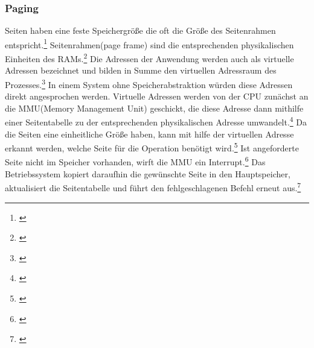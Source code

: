 \subsubsection{Paging}
Seiten haben eine feste Speichergröße die oft die Größe des Seitenrahmen entspricht.\footnote{\cite[S.~253]{Tanenbaum.2016}} Seitenrahmen(page frame) sind die entsprechenden physikalischen Einheiten des RAMs.\footnote{\cite[S.~253]{Tanenbaum.2016}} Die Adressen der Anwendung werden auch als virtuelle Adressen bezeichnet und bilden in Summe den virtuellen Adressraum des Prozesses.\footnote{\cite[S.~253]{Tanenbaum.2016}} In einem System ohne Speicherabstraktion würden diese Adressen direkt angesprochen werden. Virtuelle Adressen werden von der CPU zunächst an die MMU(Memory Management Unit) geschickt, die diese Adresse dann mithilfe einer Seitentabelle zu der entsprechenden physikalischen Adresse umwandelt.\footnote{\cite[S.~253]{Tanenbaum.2016}} Da die Seiten eine einheitliche Größe haben, kann mit hilfe der virtuellen Adresse erkannt werden, welche Seite für die Operation benötigt wird.\footnote{\cite[S.~253]{Tanenbaum.2016}} Ist angeforderte Seite nicht im Speicher vorhanden, wirft die MMU ein Interrupt.\footnote{\cite[S.~254--255]{Tanenbaum.2016}} Das Betriebssystem kopiert daraufhin die gewünschte Seite in den Hauptspeicher, aktualisiert die Seitentabelle und führt den fehlgeschlagenen Befehl erneut aus.\footnote{\cite[S.~254--255]{Tanenbaum.2016}}

